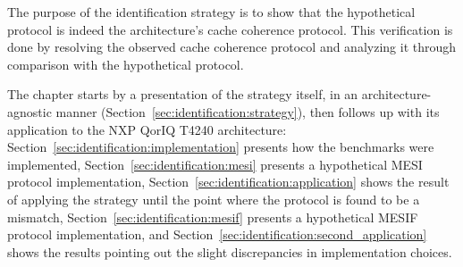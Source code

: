 The purpose of the identification strategy is to show that the hypothetical
protocol is indeed the architecture's cache coherence protocol. This
verification is done by resolving the observed cache coherence protocol and
analyzing it through comparison with the hypothetical protocol.

The chapter starts by a presentation of the strategy itself, in an
architecture-agnostic manner (Section~\ref{sec:identification:strategy}), then
follows up with its application to the NXP QorIQ T4240 architecture:
Section~\ref{sec:identification:implementation} presents how the benchmarks
were implemented, Section~\ref{sec:identification:mesi} presents a hypothetical
MESI protocol implementation, Section~\ref{sec:identification:application}
shows the result of applying the strategy until the point where the protocol is
found to be a mismatch, Section~\ref{sec:identification:mesif} presents a
hypothetical MESIF protocol implementation, and
Section~\ref{sec:identification:second_application} shows the results pointing
out the slight discrepancies in implementation choices.
